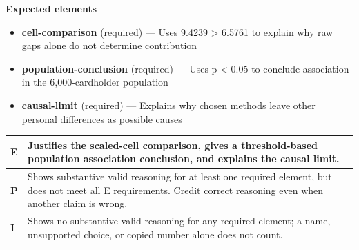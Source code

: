 \documentclass[11pt]{article}
\begin{document}

\textbf{Expected elements}
\begin{itemize}[leftmargin=1.5em,itemsep=2pt,topsep=2pt]
  \item \textbf{cell-comparison} (required) --- Uses 9.4239 > 6.5761 to explain why raw gaps alone do not determine contribution
  \item \textbf{population-conclusion} (required) --- Uses p < 0.05 to conclude association in the 6,000-cardholder population
  \item \textbf{causal-limit} (required) --- Explains why chosen methods leave other personal differences as possible causes
\end{itemize}

{\small\renewcommand{\arraystretch}{1.25}
\noindent\begin{tabular}{|p{0.5in}|p{5.9in}|}
\hline
\textbf{E} & Justifies the scaled-cell comparison, gives a threshold-based population association conclusion, and explains the causal limit. \\ \hline
\textbf{P} & Shows substantive valid reasoning for at least one required element, but does not meet all E requirements. Credit correct reasoning even when another claim is wrong. \\ \hline
\textbf{I} & Shows no substantive valid reasoning for any required element; a name, unsupported choice, or copied number alone does not count. \\ \hline
\end{tabular}}

\clearpage
{}
\end{document}

